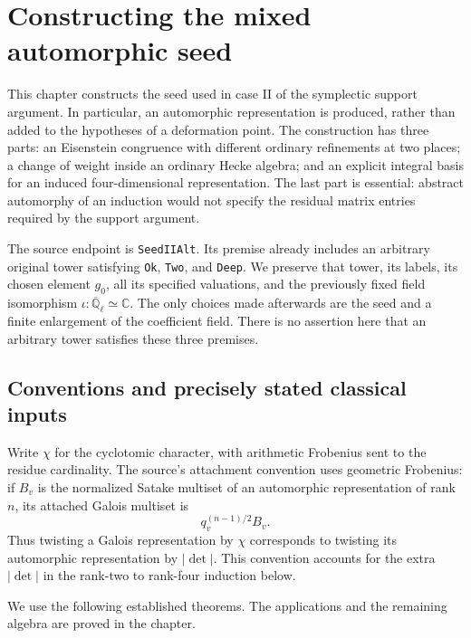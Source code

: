 \section{Constructing the mixed automorphic seed}
\label{sec:symplectic-automorphic-seeds}

This chapter constructs the seed used in case II of the symplectic
support argument.  In particular, an automorphic representation is
produced, rather than added to the hypotheses of a deformation point.
The construction has three parts: an Eisenstein congruence with different
ordinary refinements at two places; a change of weight inside an ordinary
Hecke algebra; and an explicit integral basis for an induced
four-dimensional representation.  The last part is essential: abstract
automorphy of an induction would not specify the residual matrix entries
required by the support argument.

The source endpoint is \texttt{SeedIIAlt}.  Its premise already includes
an arbitrary original tower satisfying \texttt{Ok}, \texttt{Two}, and
\texttt{Deep}.  We preserve that tower, its labels, its chosen element
$g_0$, all its specified valuations, and the previously fixed field
isomorphism $\iota:\overline{\mathbb Q}_\ell\simeq\mathbb C$.
The only choices made afterwards are the seed and a finite enlargement
of the coefficient field.  There is no assertion here that an arbitrary
tower satisfies these three premises.

\subsection{Conventions and precisely stated classical inputs}

Write $\chi$ for the cyclotomic character, with arithmetic Frobenius
sent to the residue cardinality.  The source's attachment convention
uses geometric Frobenius: if $B_v$ is the normalized Satake multiset
of an automorphic representation of rank $n$, its attached Galois
multiset is
\[
                 q_v^{(n-1)/2} B_v.                 \tag{SX.1}
\]
Thus twisting a Galois representation by $\chi$ corresponds to
twisting its automorphic representation by $|\det|$.  This convention
accounts for the extra $|\det|$ in the rank-two to rank-four induction
below.

We use the following established theorems.  The applications and the
remaining algebra are proved in the chapter.

